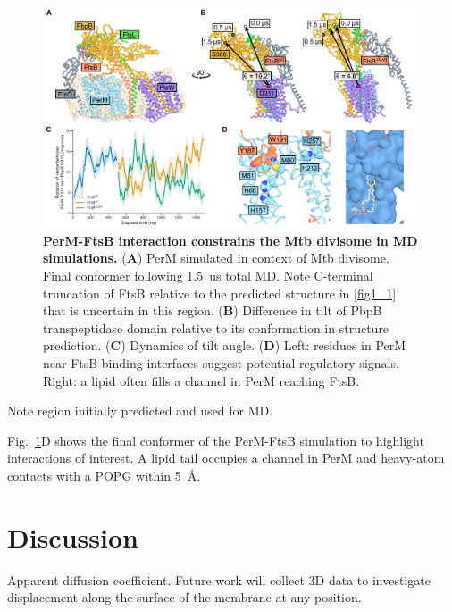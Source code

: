 \documentclass[pdflatex,sn-basic]{sn-jnl}%
\newcommand\mtb{Mtb}
\begin{document}
\loremipsum{}

\begin{figure}[h]
\centering
\includegraphics[width=1.0\textwidth]{../figures/fig5.png}
\caption{
    \textbf{PerM-FtsB interaction constrains the \mtb{} divisome in MD simulations.}
    (\textbf{A}) PerM simulated in context of \mtb{} divisome. Final conformer following \qty{1.5}{us} total MD. Note C-terminal truncation of FtsB relative to the predicted structure in \ref{fig1_1} that is uncertain in this region.
    (\textbf{B}) Difference in tilt of PbpB transpeptidase domain relative to its conformation in structure prediction.
    (\textbf{C}) Dynamics of tilt angle. (\textbf{D}) Left: residues in PerM near FtsB-binding interfaces suggest potential regulatory signals. Right: a lipid often fills a channel in PerM reaching FtsB.
}\label{fig5}
\end{figure}

Note region initially predicted and used for MD.

Fig.~\ref{fig5}D shows the final conformer of the PerM-FtsB simulation to highlight interactions of interest.
A lipid tail occupies a channel in PerM and heavy-atom contacts with a POPG within \qty{5}{\angstrom}.

\section{Discussion}

Apparent diffusion coefficient. Future work will collect 3D data to investigate displacement along the surface of the membrane at any position.
\end{document}
